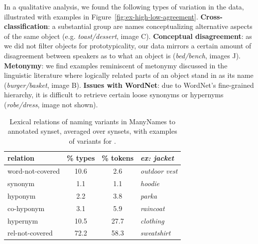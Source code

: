 
In a qualitative analysis, we found the following types of variation in the data, illustrated with examples in Figure~\ref{fig:ex-high-low-agreement}.
\textbf{Cross-classification}: a substantial group are names conceptualizing alternative aspects of the same object (e.g. \textit{toast/dessert}, image C).
\textbf{Conceptual disagreement}: as we did not filter objects for prototypicality, our data mirrors a certain amount of disagreement between speakers as to what an object is (\textit{bed/bench}, images J).
\textbf{Metonymy}: we find examples reminiscent of metonymy discussed in the linguistic literature \cite{pustejovsky1991generative} where logically related parts of an object stand in as its name (\textit{burger/basket}, image B). 
\textbf{Issues with WordNet}: due to WordNet's fine-grained hierarchy, it is difficult to retrieve certain loose synonyms or hypernyms (\textit{robe/dress}, image not shown).
%
\begin{table}[t]
\centering
\setlength{\tabcolsep}{2pt}
\begin{tabular}{lcc|p{2.5cm}}
\toprule
         relation & \% types & \% tokens & \it ex: jacket \\
\midrule
 word-not-covered &  10.6 &  2.6 & \it outdoor vest\\
\midrule
 synonym &  1.1 &  1.1 & \it hoodie  \\
 hyponym &  2.2 &  3.8 & \it parka\\ %
 co-hyponym &  3.1 &  5.9 & \it raincoat\\
 hypernym &  10.5 &  27.7 & \it clothing \\%
 rel-not-covered &  72.2 &  58.3 & \it sweatshirt\\%
\bottomrule
\end{tabular}
\caption{Lexical relations of naming variants in ManyNames to annotated \vg synset, averaged over synsets, with examples of variants for .}
\label{tab:rel}
\vspace{-0.5cm}
\end{table}


